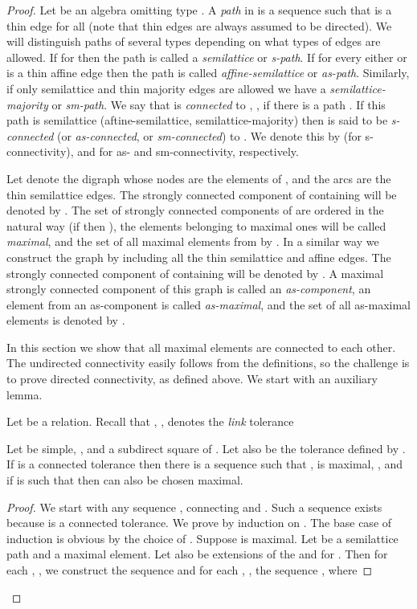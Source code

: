 \documentclass[11pt]{article}
\begin{document}
\begin{proof}
Let  be an algebra omitting type \one. A \emph{path} in  is a sequence 
 such that  is a thin edge for all  (note that thin 
edges are always assumed to be directed). We will 
distinguish paths of several types depending on what types of edges are allowed. 
If  for  then the path is called a \emph{semilattice} or 
\emph{s-path}. If for every  either  or  is a thin
affine edge then the path is called \emph{affine-semilattice} or \emph{as-path}. 
Similarly, if only semilattice and thin majority edges are allowed we have a 
\emph{semilattice-majority} or \emph{sm-path}. 
We say that  is \emph{connected} to , , if there is a path 
. If this path is semilattice (aftine-semilattice, 
semilattice-majority) then  is said to be \emph{s-connected} (or \emph{as-connected},
or \emph{sm-connected}) to . We denote this by  (for s-connectivity),
 and  for as- and sm-connectivity, respectively.

Let  denote the digraph whose nodes are the elements of , and
the arcs are the thin semilattice edges. The strongly connected component of 
containing  will be denoted by . The set of strongly connected 
components of  are ordered in the natural way (if  then ), 
the elements belonging to maximal ones will be called \emph{maximal}, and
the set of all maximal elements from  by . In a similar way
we construct the graph  by including all the thin semilattice and 
affine edges. The strongly connected component of  containing
 will be denoted by . A maximal strongly connected component 
of this graph is called an \emph{as-component}, an element from an as-component 
is called \emph{as-maximal}, and the set of all as-maximal elements is denoted by 
.

In this section we show that all maximal elements are connected to each other.
The undirected connectivity easily follows from the definitions, so the challenge 
is to prove directed connectivity, as defined above. We start with an auxiliary lemma.

Let  be a relation. Recall that , ,  denotes
the \emph{link} tolerance 



\begin{lemma}\label{lem:going-maximal}
Let  be simple, , and  a
subdirect square of . Let also  be the tolerance defined
by . If
 is a connected tolerance then there is a sequence  such that ,  is maximal, , and if  is such that  then
 can also be chosen maximal. 
\end{lemma}

\begin{proof}
We start with any sequence , 
connecting  and . Such a sequence exists because  is a
connected tolerance. We prove by induction on .  
The base case of induction is obvious by the choice
of . Suppose  is maximal. Let  be
a semilattice path and  a maximal element. Let also
 be extensions of the  and
 for . Then for each , , we construct the sequence  and for
each , , the sequence , where 


\end{proof}
\end{proof}
\end{document}
